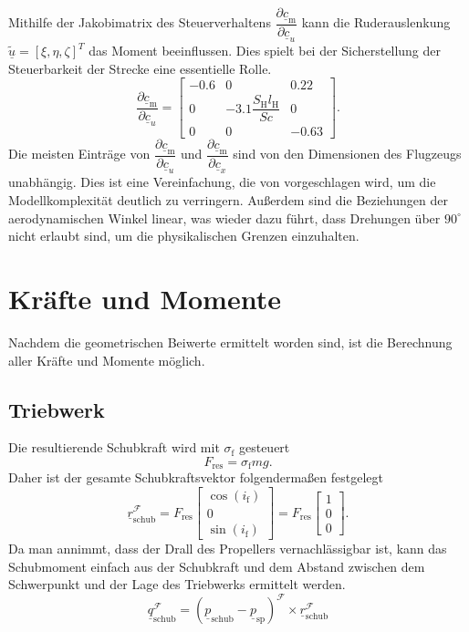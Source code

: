 Mithilfe der Jakobimatrix des Steuerverhaltens $\dfrac{\partial  \underline{c}_\mathrm{m}}{\partial  \underline{c}_u}$ kann die Ruderauslenkung $\tilde{\underline{u}} = [\xi,\eta,
\zeta]^T$ das Moment beeinflussen. Dies spielt bei der Sicherstellung der Steuerbarkeit der Strecke eine essentielle Rolle. 
\begin{equation}
\dfrac{\partial  \underline{c}_\mathrm{m}}{\partial  \underline{c}_u} = \begin{bmatrix} 
-0.6 & 0 & 0.22 \\
0 &-3.1\dfrac{S_\mathrm{H}l_\mathrm{H}}{Sc}&0 \\
0 & 0 & -0.63
\end{bmatrix}.
\end{equation}
Die meisten Einträge von $\dfrac{\partial  \underline{c}_\mathrm{m}}{\partial  \underline{c}_u}$ und  $\dfrac{\partial  \underline{c}_\mathrm{m}}{\partial  \underline{c}_x}$ sind von den Dimensionen des Flugzeugs unabhängig. Dies ist eine Vereinfachung, die von \cite{RAMPaper} vorgeschlagen wird, um die Modellkomplexität deutlich  zu verringern. Au{\ss}erdem sind die Beziehungen der aerodynamischen Winkel linear, was wieder dazu führt, dass Drehungen über $90^{\circ}$ nicht erlaubt sind, um die physikalischen Grenzen einzuhalten.
\section{Kräfte und Momente}
\label{sec:Kräfte}
Nachdem die geometrischen Beiwerte ermittelt worden sind, ist die Berechnung aller Kräfte und Momente möglich.
\subsection{Triebwerk}
Die resultierende Schubkraft wird mit $\sigma_\mathrm{f}$ gesteuert
\begin{equation}
F_\mathrm{res} = \sigma_\mathrm{f} mg.
\end{equation}
Daher ist der gesamte Schubkraftsvektor folgenderma{\ss}en festgelegt
\begin{equation}
\underline{r}^\mathcal{F}_\mathrm{schub} = F_\mathrm{res}\begin{bmatrix} 
\cos(i_\mathrm{f})\\
0\\
\sin(i_\mathrm{f})
\end{bmatrix} = F_\mathrm{res}\begin{bmatrix} 
1\\
0\\
0
\end{bmatrix}.
\end{equation}
Da man annimmt, dass der Drall des Propellers vernachlässigbar ist, kann das Schubmoment einfach aus der Schubkraft und dem Abstand zwischen dem Schwerpunkt und der Lage des Triebwerks ermittelt werden.
\begin{equation}
\underline{q}^\mathcal{F}_\mathrm{schub} = (\underline{p}_\mathrm{schub}-\underline{p}_\mathrm{sp})^\mathcal{F}\times\underline{r}^\mathcal{F}_\mathrm{schub}
\end{equation} 
